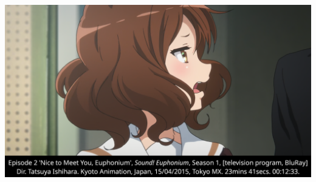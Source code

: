 \documentclass[aspectratio=169]{beamer}
\begin{document}
\begin{frame}[plain]
  \begin{columns}[c]
    \column{\paperwidth}
    \includegraphics[width=\paperwidth, height=\paperheight]{images/00:12:33 Kumiko Geh Saison 1 Episode 1.png}
  \end{columns}
\end{frame}
\end{document}
